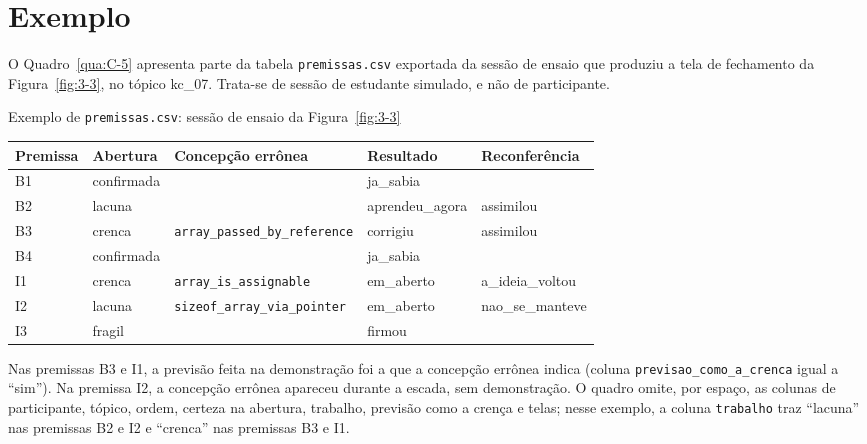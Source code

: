 \section{Exemplo}

O Quadro~\ref{qua:C-5} apresenta parte da tabela \texttt{premissas.csv} exportada da sessão de ensaio que produziu a tela de fechamento da Figura~\ref{fig:3-3}, no tópico kc\_07. Trata-se de sessão de estudante simulado, e não de participante.

\begin{quadro}[htbp]
\caption{Exemplo de \texttt{premissas.csv}: sessão de ensaio da Figura~\ref{fig:3-3}}\label{qua:C-5}
\footnotesize
\begin{tabularx}{\textwidth}{|>{\centering\arraybackslash}p{2.2cm}|>{\centering\arraybackslash}p{2.6cm}|X|X|X|}
\hline
\textbf{Premissa} & \textbf{Abertura} & \textbf{Concepção errônea} & \textbf{Resultado} & \textbf{Reconferência} \\ \hline
B1 & confirmada &  & ja\_sabia &  \\ \hline
B2 & lacuna &  & aprendeu\_agora & assimilou \\ \hline
B3 & crenca & \texttt{array\_\allowbreak{}passed\_\allowbreak{}by\_\allowbreak{}reference} & corrigiu & assimilou \\ \hline
B4 & confirmada &  & ja\_sabia &  \\ \hline
I1 & crenca & \texttt{array\_\allowbreak{}is\_\allowbreak{}assignable} & em\_aberto & a\_ideia\_voltou \\ \hline
I2 & lacuna & \texttt{sizeof\_\allowbreak{}array\_\allowbreak{}via\_\allowbreak{}pointer} & em\_aberto & nao\_se\_manteve \\ \hline
I3 & fragil &  & firmou &  \\ \hline
\end{tabularx}
\end{quadro}

Nas premissas B3 e I1, a previsão feita na demonstração foi a que a concepção errônea indica (coluna \texttt{previsao\_\allowbreak{}como\_\allowbreak{}a\_\allowbreak{}crenca} igual a ``sim''). Na premissa I2, a concepção errônea apareceu durante a escada, sem demonstração. O quadro omite, por espaço, as colunas de participante, tópico, ordem, certeza na abertura, trabalho, previsão como a crença e telas; nesse exemplo, a coluna \texttt{trabalho} traz ``lacuna'' nas premissas B2 e I2 e ``crenca'' nas premissas B3 e I1.
